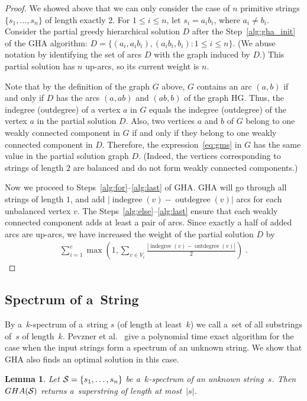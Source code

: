 \documentclass[11pt]{article}
\newtheorem{lemma}{Lemma}
\DeclareMathOperator{\indegree}{indegree}
\DeclareMathOperator{\outdegree}{outdegree}
\renewcommand{\leq}{\leqslant}
\begin{document}
\begin{proof}
We showed above that we can only consider the case of $n$ primitive strings $\{s_1,\ldots,s_n\}$ of length exactly $2$. For $1\leq i\leq n$, let $s_i=a_i b_i$, where $a_i\neq b_i$. Consider the partial greedy hierarchical solution $D$ after the Step~\ref{alg:gha_init} of the GHA algorithm: $D=\{(a_i, a_ib_i), (a_ib_i, b_i): 1\leq i\leq n \}$. (We abuse notation by identifying the set of arcs $D$ with the graph induced by $D$.) This partial solution has $n$ up-arcs, so its current weight is $n$. 

Note that by the definition of the graph $G$ above, $G$ contains an arc $(a, b)$ if and only if $D$ has the arcs $(a, ab)$ and $(ab, b)$ of the graph HG. Thus, the indegree (outdegree) of a vertex $a$ in $G$ equals the indegree (outdegree) of the vertex $a$ in the partial solution $D$. Also, two vertices $a$ and $b$ of $G$ belong to one weakly connected component in $G$ if and only if they belong to one weakly connected component in $D$. Therefore, the expression~\ref{eq:gms} in $G$ has the same value in the partial solution graph $D$. (Indeed, the vertices corresponding to strings of length $2$ are balanced and do not form weakly connected components.) 

Now we proceed to Steps~\ref{alg:for}--\ref{alg:last} of GHA. GHA will go through all strings of length $1$, and add $|\indegree(v) - \outdegree(v)|$ arcs for each unbalanced vertex $v$. The Steps~\ref{alg:else}--\ref{alg:last} ensure that each weakly connected component adds at least a pair of arcs. Since exactly a half of added arcs are up-arcs, we have increased the weight of the partial solution $D$ by
\begin{align*}
\sum_{i=1}^{c} {\max\left( 1, \sum_{v \in V_i}{ \frac{ |\indegree(v) - \outdegree(v)|}{2} }\right)} \; .
\end{align*}
\end{proof}

\subsection{Spectrum of a~String}
By a~$k$-spectrum of a~string $s$ 
(of length at least~$k$)
we call a~set of all substrings of~$s$ of length~$k$.
Pevzner et al.~\cite{pevzner2001eulerian} give a polynomial time exact algorithm for the case when the input strings form a spectrum of an unknown string. We show that GHA also finds an optimal solution in this case.

\begin{lemma}
Let ${\cal S}=\{s_1,\ldots,s_n\}$ be a~$k$-spectrum of an unknown string~$s$. Then $GHA({\cal S})$ returns a~superstring of length at most~$|s|$.
\end{lemma}
\end{document}
